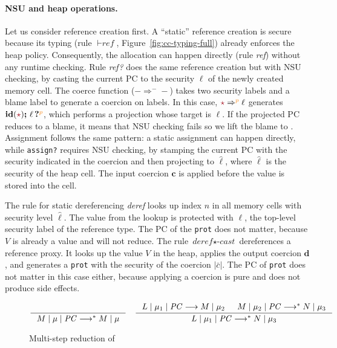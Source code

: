 \paragraph{NSU and heap operations.} Let us consider reference creation
first. A ``static'' reference creation is secure because its typing (rule
${\vdash}\textit{ref}$, Figure~\ref{fig:cc-typing-full}) already enforces the
heap policy. Consequently, the allocation can happen directly (rule
\textit{ref}) without any runtime checking. Rule \textit{ref?} does the same
reference creation but with NSU checking, by casting the current PC to the
security $\ell$ of the newly created memory cell. The coerce function
(${-}\Rightarrow^{-}{-}$) takes two security labels and a blame label to
generate a coercion on labels. In this case, $\unk \Rightarrow^{\bl{p}} \ell$
generates $\id{\unk}\seq\proj{\ell}{p}$, which performs a projection whose
target is $\ell$. If the projected PC reduces to a blame, it means that NSU
checking fails so we lift the blame to \CC. Assignment follows the same pattern:
a static assignment can happen directly, while \texttt{assign?} requires NSU
checking, by stamping the current PC with the security indicated in the coercion
and then projecting to $\hat{\ell}$, where $\hat{\ell}$ is the security of the
heap cell. The input coercion $\bm{c}$ is applied before the value is stored
into the cell.

The rule for static dereferencing \textit{deref} looks up index $n$ in
all memory cells with security level $\hat{\ell}$. The value from the
lookup is protected with $\ell$, the top-level security label of the
reference type. The PC of the \texttt{prot} does not matter, because
$V$ is already a value and will not reduce.
The rule $\textit{deref}{\star}\textit{-cast}$ dereferences a reference proxy.
It looks up the value $V$ in the heap, applies the output coercion $\bm{d}$,
and generates a \texttt{prot} with the security of the coercion $|\bar{c}|$.
The PC of \texttt{prot} does not matter in this case either, because
applying a coercion is pure and does not produce side effects.


\begin{figure}
  \begin{gather*}
    \inference{}{\reducemult{M}{\mu}{\PC}{M}{\mu}}
    \quad
    \inference{\reduce{L}{\mu_1}{\PC}{M}{\mu_2} & \reducemult{M}{\mu_2}{\PC}{N}{\mu_3}}
    {\reducemult{L}{\mu_1}{\PC}{N}{\mu_3}}
  \end{gather*}
  \caption{Multi-step reduction of \CC}
  \label{fig:multi-step}
\end{figure}

